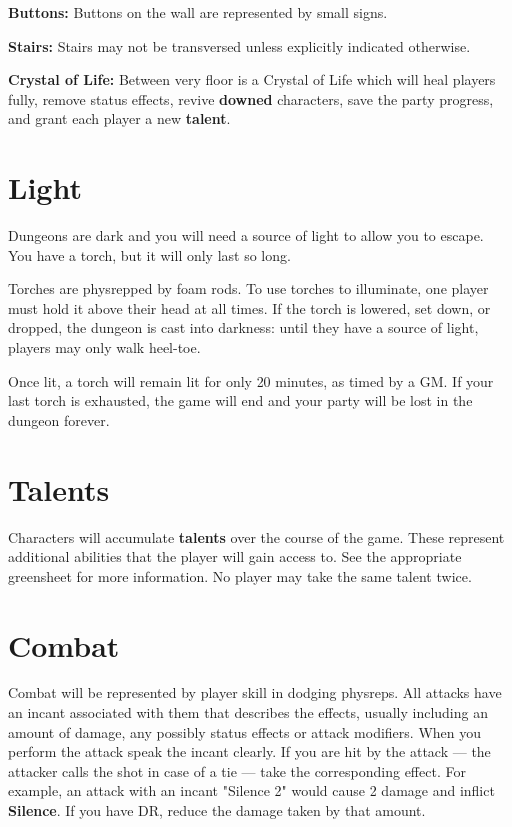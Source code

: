 \documentclass[green]{grimrock}
\begin{document}
{\bf Buttons:} Buttons on the wall are represented by small signs.

{\bf Stairs:} Stairs may not be transversed unless explicitly indicated otherwise.

{\bf Crystal of Life:}  Between very floor is a Crystal of Life which will heal players fully, remove status effects, revive {\bf downed} characters, save the party progress, and grant each player a new {\bf talent}.

\section{Light}

Dungeons are dark and you will need a source of light to allow you to escape.  You have a torch, but it will only last so long.

Torches are physrepped by foam rods.  To use torches to illuminate, one player must hold it above their head at all times.  If the torch is lowered, set down, or dropped, the dungeon is cast into darkness: until they have a source of light, players may only walk heel-toe.

Once lit, a torch will remain lit for only 20 minutes, as timed by a GM.  If your last torch is exhausted, the game will end and your party will be lost in the dungeon forever.

\section{Talents}

Characters will accumulate {\bf talents} over the course of the game.  These represent additional abilities that the player will gain access to.  See the appropriate greensheet for more information.  No player may take the same talent twice.

\section{Combat}

Combat will be represented by player skill in dodging physreps.  All attacks have an incant associated with them that describes the effects, usually including an amount of damage, any possibly status effects or attack modifiers.  When you perform the attack speak the incant clearly.  If you are hit by the attack --- the attacker calls the shot in case of a tie --- take the corresponding effect.  For example, an attack with an incant "Silence 2" would cause 2 damage and inflict {\bf Silence}.  If you have DR, reduce the damage taken by that amount.
\end{document}
